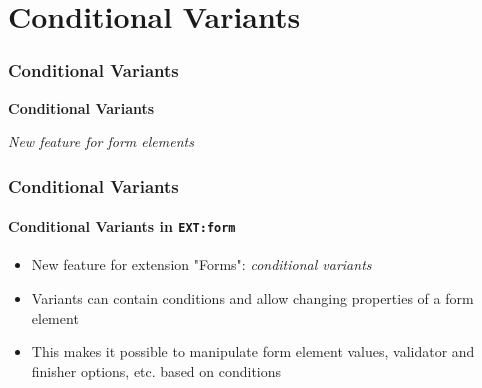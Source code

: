 %

\section{Conditional Variants}
\begin{frame}[fragile]
	\frametitle{Conditional Variants}

	\begin{center}\huge{\color{typo3darkgrey}\textbf{Conditional Variants}}\end{center}
	\begin{center}\large{\textit{New feature for form elements}}\end{center}

\end{frame}


\begin{frame}[fragile]
	\frametitle{Conditional Variants}
	\framesubtitle{Conditional Variants in \texttt{EXT:form}}

	\begin{itemize}
		\item New feature for extension "Forms": \textit{conditional variants}
		\item Variants can contain conditions and allow changing properties of a
			form element
		\item This makes it possible to manipulate form element values,
			validator and finisher options, etc. based on conditions

	\end{itemize}

\end{frame}



